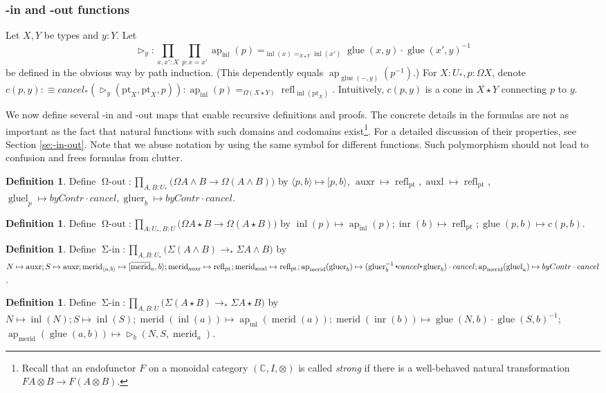 \documentclass{amsart}
\theoremstyle{definition}
\newtheorem{de}[theorem]{Definition}
\newcommand{\CC}{\mathbb{C}}
\newcommand{\ap}{\operatorname{ap}}
\newcommand{\refl}{\operatorname{refl}}
\newcommand{\inl}{\operatorname{inl}}
\newcommand{\inr}{\operatorname{inr}}
\newcommand{\glue}{\operatorname{glue}}
\newcommand{\gluel}{\operatorname{gluel}}
\newcommand{\gluer}{\operatorname{gluer}}
\newcommand{\auxl}{\operatorname{auxl}}
\newcommand{\auxr}{\operatorname{auxr}}
\newcommand{\merid}{\operatorname{merid}}
\newcommand{\mmerid}{\overline{{\operatorname{merid}}}}
\newcommand{\depfun}[2]{\prod\limits_{#1}^{}{#2}}
\newcommand{\bs}[1]{\mathrm{pt}_{#1}}
\newcommand{\pto}{\to_*}
\newcommand{\oout}{\operatorname{\Omega-out}}
\newcommand{\siin}{\operatorname{\Sigma-in}}
\newcommand{\whisk}{\raisebox{0.5ex}{$\displaystyle\centerdot$}}
\newcommand{\join}{\star}
\newcommand{\lpsl}[2]{[#1, #2 \rangle}
\newcommand{\cone}{\vartriangleright}
\begin{document}
\subsubsection{-in and -out functions}


Let $X, Y$ be types and $y:Y$. Let
$$\cone_y:\depfun{x,x':X}{\depfun{p:x=x'}{\ap_{\inl}(p) =_{\inl(x) =_{X \join Y} \inl(x')} \glue(x,y) \cdot \glue(x',y)^{-1}}}$$
be defined in the obvious way by path induction. (This dependently equals $\ap_{\glue(-,y)}(p^{-1}).$)
For $X : U_*, p: \Omega X$, denote $c(p,y) :\equiv cancel_* (\cone_y(\bs{X}, \bs{X}, p)) : \ap_{\inl}(p) =_{\Omega (X \join Y)} \refl_{\inl(\bs{X})}$.
Intuitively, $c(p,y)$ is a cone in $X \join Y$ connecting $p$ to $y$.


We now define several -in and -out maps that enable recursive definitions and proofs. The concrete details in the formulas are not as important as the fact that natural functions with such domains and codomains exist\footnote{Recall that an endofunctor $F$ on a monoidal category $(\CC, I, \otimes)$ is called \textit{strong} if there is a well-behaved natural transformation $F A  \otimes B \to F ( A \otimes B)$.}. For a detailed discussion of their properties, see Section \ref{se:-in-out}.
Note that we abuse notation by using the same symbol for different functions. Such polymorphism should not lead to confusion and frees formulas from clutter.

\begin{de}
    Define $\oout: \depfun{A, B: U_*}{(\Omega A \wedge B \to \Omega (A \wedge B)})$ by $\langle p, b \rangle \mapsto \lpsl{p}{b}$, $\auxr \mapsto \refl_{\bs{}}, \auxl \mapsto \refl_{\bs{}}$, $\gluel_p \mapsto byContr \cdot cancel, \gluer_b \mapsto byContr \cdot cancel$.
\end{de}
\begin{de}
    Define $\oout: \depfun{A: U_*,B: U}{(\Omega A \join B \to \Omega (A \join B)})$ by $\inl(p) \mapsto \ap_{\inl}(p); \inr(b) \mapsto \refl_{\bs{}}; \glue(p, b) \mapsto c(p,b)$.
\end{de}
\begin{de}
    Define $\siin: \depfun{A, B: U_*}{(\Sigma(A \wedge B) \pto \Sigma A \wedge B})$ by $N \mapsto \auxr; S \mapsto \auxr; \merid_{\langle a, b \rangle} \mapsto [\mmerid_a, b \rangle; \merid_{\auxr} \mapsto \refl_{\bs{}}; \merid_{\auxl} \mapsto \refl_{\bs{}}; \ap_{\merid}(\gluer_b) \mapsto (\gluer_b^{-1} \whisk cancel \whisk \gluer_b) \cdot cancel; \ap_{\merid}(\gluel_a) \mapsto byContr \cdot cancel$.
\end{de}
\begin{de}
    Define $\siin: \depfun{A, B: U}{(\Sigma (A \join B) \pto \Sigma A \join B})$ by $N \mapsto \inl(N); S \mapsto \inl(S); \merid(\inl(a)) \mapsto \ap_{\inl}(\merid(a)); \merid(\inr(b)) \mapsto \glue(N, b) \cdot \glue(S, b)^{-1};$ $\ap_{\merid}(\glue(a,b)) \mapsto \cone_b(N, S, \merid_a)$.
\end{de}
\end{document}
